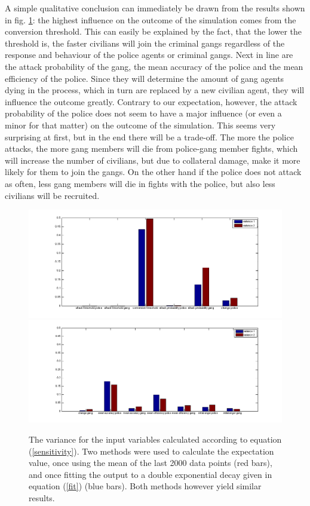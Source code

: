 \documentclass[11pt]{article}
\begin{document}
A simple qualitative conclusion can immediately be drawn from the results shown in fig. \ref{varianceequilibrium}: the highest influence on the outcome of the simulation comes from the conversion threshold. This can easily be explained by the fact, that the lower the threshold is, the faster civilians will join the criminal gangs regardless of the response and behaviour of the police agents or criminal gangs. Next in line are the attack probability of the gang, the mean accuracy of the police and the mean efficiency of the police. Since they will determine the amount of gang agents dying in the process, which in turn are replaced by a new civilian agent, they will influence the outcome greatly. Contrary to our expectation, however, the attack probability of the police does not seem to have a major influence (or even a minor for that matter) on the outcome of the simulation. This seems very surprising at first, but in the end there will be a trade-off. The more the police attacks, the more gang members will die from police-gang member fights, which will increase the number of civilians, but due to collateral damage, make it more likely for them to join the gangs. On the other hand if the police does not attack as often, less gang members will die in fights with the police, but also less civilians will be recruited.
 
\begin{figure}[h!]
	\centering
	\includegraphics[width=\textwidth]{varianceeq1.png}
	\includegraphics[width=\textwidth]{varianceeq2.png}
	\caption{The variance for the input variables calculated according to equation (\ref{sensitivity}). Two methods were used to calculate the expectation value, once using the mean of the last 2000 data points (red bars), and once fitting the output to a double exponential decay given in equation (\ref{fit}) (blue bars). Both methods however yield similar results.}\label{varianceequilibrium}
\end{figure}
\end{document}
